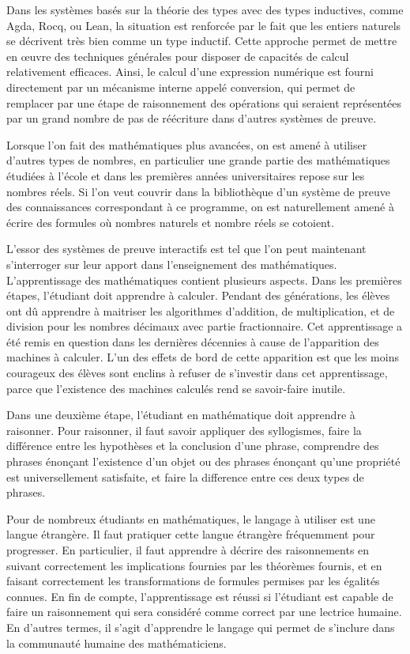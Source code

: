 \documentclass[draft]{jflart}
\begin{document}
Dans les systèmes basés sur la théorie des types avec des types
inductives, comme Agda, Rocq, ou Lean, la situation est renforcée par
le fait que les entiers naturels se décrivent très bien comme un type
inductif.  Cette approche permet de mettre en œuvre des techniques
générales pour disposer de capacités de calcul relativement efficaces.
Ainsi, le calcul d'une expression numérique est fourni directement par
un mécanisme interne appelé conversion, qui permet de remplacer par
une étape de raisonnement des opérations qui seraient représentées par
un grand nombre de pas de réécriture dans d'autres systèmes de preuve.

Lorsque l'on fait des mathématiques plus avancées, on est amené à
utiliser d'autres types de nombres, en particulier une grande partie
des mathématiques étudiées à l'école et dans les premières années
universitaires repose sur les nombres réels.  Si l'on veut couvrir
dans la bibliothèque d'un système de preuve des connaissances
correspondant à ce programme, on est naturellement amené à écrire des
formules où nombres naturels et nombre réels se cotoient.

L'essor des systèmes de preuve interactifs est tel que l'on peut
maintenant s'interroger sur leur apport dans l'enseignement des
mathématiques.  L'apprentissage des mathématiques contient plusieurs
aspects.  Dans les premières étapes, l'étudiant doit apprendre à
calculer.  Pendant des générations, les élèves ont dû apprendre à
maitriser les algorithmes d'addition, de multiplication, et de
division pour les nombres décimaux avec partie fractionnaire.  Cet
apprentissage a été remis en question dans les dernières décennies à
cause de l'apparition des machines à calculer.  L'un des effets de
bord de cette apparition est que les moins courageux des élèves sont
enclins à refuser de s'investir dans cet apprentissage, parce que
l'existence des machines calculés rend se savoir-faire inutile.

Dans une deuxième étape, l'étudiant en mathématique doit apprendre à
raisonner.  Pour raisonner, il faut savoir appliquer des
syllogismes, faire la différence entre les hypothèses et la conclusion
d'une phrase, comprendre des phrases énonçant l'existence d'un objet
ou des phrases énonçant qu'une propriété est universellement
satisfaite, et faire la difference entre ces deux types de phrases.

Pour de nombreux étudiants en mathématiques, le langage à utiliser est
une langue étrangère.  Il faut pratiquer cette langue étrangère
fréquemment pour progresser.  En particulier, il faut apprendre à décrire
des raisonnements en suivant correctement les implications fournies par
les théorèmes fournis, et en faisant correctement les transformations
de formules permises par les égalités connues.  En fin de compte,
l'apprentissage est réussi si l'étudiant est capable de faire un
raisonnement qui sera considéré comme correct par une lectrice humaine.
En d'autres termes, il s'agit d'apprendre le langage qui permet de
s'inclure dans la communauté humaine des mathématiciens.
\end{document}
